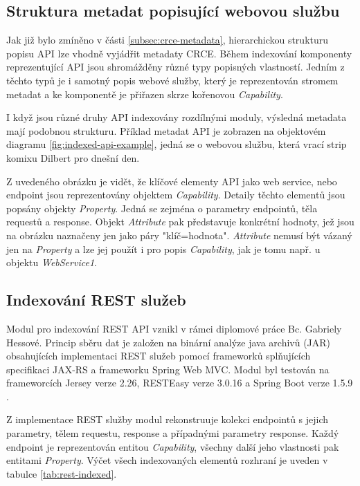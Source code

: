 \documentclass[czech,DP]{thesiskiv}
\begin{document}
\subsection{Struktura metadat popisující webovou službu}

Jak již bylo zmíněno v části \ref{subsec:crce-metadata}, hierarchickou strukturu popisu API lze vhodně vyjádřit metadaty CRCE. Během indexování komponenty reprezentující API jsou shromážděny různé typy popisných vlastností. Jedním z těchto typů je i samotný popis webové služby, který je reprezentován stromem metadat a ke komponentě je přiřazen skrze  kořenovou \textit{Capability}.   

I když jsou různé druhy API indexovány rozdílnými moduly, výsledná metadata mají podobnou strukturu. Příklad metadat API je zobrazen na objektovém diagramu \ref{fig:indexed-api-example}, jedná se o webovou službu, která vrací strip komixu Dilbert pro dnešní den.

Z uvedeného obrázku je vidět, že klíčové elementy API jako web service, nebo endpoint jsou reprezentovány objektem \textit{Capability}. Detaily těchto elementů jsou popsány objekty \textit{Property}. Jedná se zejména o parametry endpointů, těla requestů a response. Objekt \textit{Attribute} pak představuje konkrétní hodnoty, jež jsou na obrázku naznačeny jen jako páry "klíč=hodnota". \textit{Attribute} nemusí být vázaný jen na \textit{Property} a lze jej použít i pro popis \textit{Capability}, jak je tomu např. u objektu \textit{WebService1}.

\subsection{Indexování REST služeb}

Modul pro indexování REST API vznikl v rámci diplomové práce Bc. Gabriely Hessové. Princip sběru dat je založen na binární analýze java archivů (JAR) obsahujících implementaci REST služeb pomocí frameworků splňujících specifikaci JAX-RS a frameworku Spring Web MVC. Modul byl testován na frameworcích Jersey verze 2.26, RESTEasy verze 3.0.16 a  Spring Boot verze 1.5.9 \cite{hessova2015rest}.

Z implementace REST služby modul rekonstruuje kolekci endpointů s jejich parametry, tělem requestu, response a případnými parametry response. Každý endpoint je reprezentován entitou \textit{Capability}, všechny další jeho vlastnosti pak entitami \textit{Property}. Výčet všech indexovaných elementů rozhraní je uveden v tabulce \ref{tab:rest-indexed}.
\end{document}
